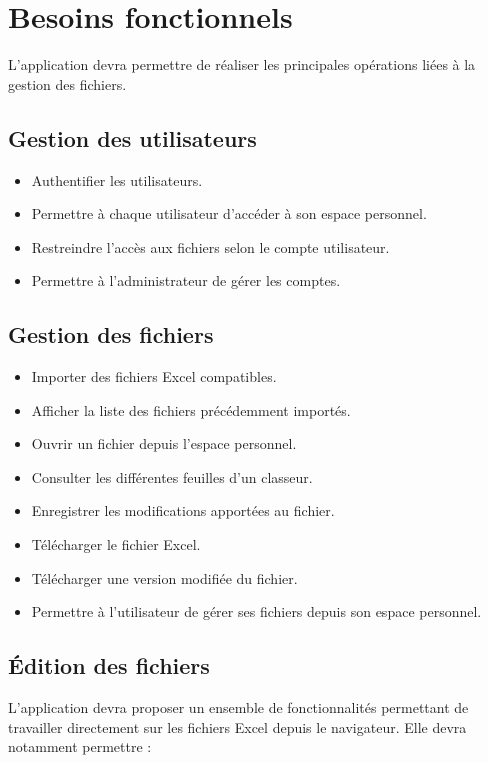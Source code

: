 \chapter{Besoins fonctionnels}

L'application devra permettre de réaliser les principales opérations liées à la gestion des fichiers.

\section{Gestion des utilisateurs}

\begin{itemize}
    \item Authentifier les utilisateurs.
    \item Permettre à chaque utilisateur d'accéder à son espace personnel.
    \item Restreindre l'accès aux fichiers selon le compte utilisateur.
    \item Permettre à l'administrateur de gérer les comptes.
\end{itemize}

\section{Gestion des fichiers}

\begin{itemize}
    \item Importer des fichiers Excel compatibles.
    \item Afficher la liste des fichiers précédemment importés.
    \item Ouvrir un fichier depuis l'espace personnel.
    \item Consulter les différentes feuilles d'un classeur.
    \item Enregistrer les modifications apportées au fichier.
    \item Télécharger le fichier Excel.
    \item Télécharger une version modifiée du fichier.
    \item Permettre à l'utilisateur de gérer ses fichiers depuis son espace personnel.
\end{itemize}

\section{Édition des fichiers}

L'application devra proposer un ensemble de fonctionnalités permettant de travailler directement sur les fichiers Excel depuis le navigateur. Elle devra notamment permettre :

